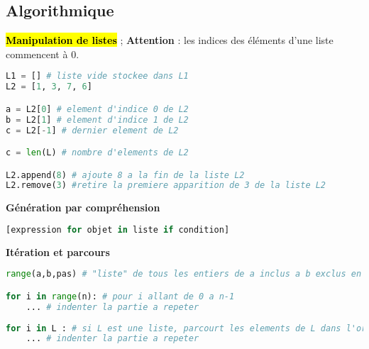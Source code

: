 \documentclass[10pt,fleqn, openany, landscape, twocolumn]{book} %
\begin{document}
\subsection*{Algorithmique}

\hl{\textbf{Manipulation de listes}} ; \textbf{Attention} : les indices des éléments d'une liste commencent à 0.

\begin{lstlisting}[language=python]
L1 = [] # liste vide stockee dans L1
L2 = [1, 3, 7, 6]

a = L2[0] # element d'indice 0 de L2
b = L2[1] # element d'indice 1 de L2
c = L2[-1] # dernier element de L2

c = len(L) # nombre d'elements de L2

L2.append(8) # ajoute 8 a la fin de la liste L2
L2.remove(3) #retire la premiere apparition de 3 de la liste L2
\end{lstlisting}

\textbf{Génération par compréhension}

\begin{lstlisting}[language=python]
[expression for objet in liste if condition]
\end{lstlisting}

\textbf{Itération et parcours}

\begin{lstlisting}[language = python]
range(a,b,pas) # "liste" de tous les entiers de a inclus a b exclus en progressant d'un pas donne

for i in range(n): # pour i allant de 0 a n-1
	... # indenter la partie a repeter
	
for i in L : # si L est une liste, parcourt les elements de L dans l'ordre
	... # indenter la partie a repeter
\end{lstlisting}
\end{document}
